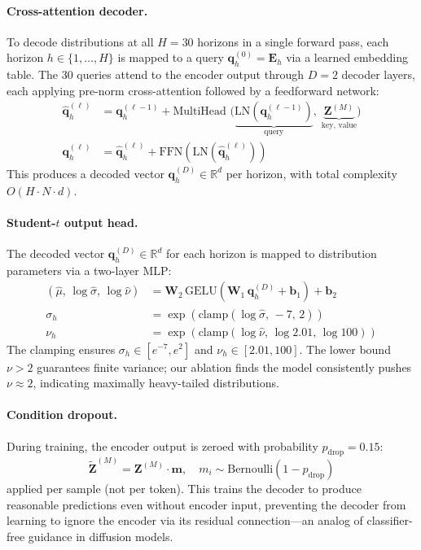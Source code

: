 \documentclass[sigconf]{acmart}
\begin{document}
\paragraph{Cross-attention decoder.}
To decode distributions at all $H = 30$ horizons in a single forward pass, each horizon $h \in \{1, \ldots, H\}$ is mapped to a query $\mathbf{q}_h^{(0)} = \mathbf{E}_h$ via a learned embedding table.
The 30 queries attend to the encoder output through $D = 2$ decoder layers, each applying pre-norm cross-attention followed by a feedforward network:
\begin{align}
\hat{\mathbf{q}}_h^{(\ell)} &= \mathbf{q}_h^{(\ell-1)} + \text{MultiHead }\!\Big(\underbrace{\text{LN}(\mathbf{q}_h^{(\ell-1)})}_{\text{query}},\; \underbrace{\mathbf{Z}^{(M)}}_{\text{key, value}}\Big) \label{eq:cross-attn} \\
\mathbf{q}_h^{(\ell)} &= \hat{\mathbf{q}}_h^{(\ell)} + \text{FFN}\!\left(\text{LN}(\hat{\mathbf{q}}_h^{(\ell)})\right) \nonumber
\end{align}
This produces a decoded vector $\mathbf{q}_h^{(D)} \in \mathbb{R}^d$ per horizon, with total complexity $O(H \cdot N \cdot d)$.

\paragraph{Student-$t$ output head.}
The decoded vector $\mathbf{q}_h^{(D)} \in \mathbb{R}^d$ for each horizon is mapped to distribution parameters via a two-layer MLP:
\begin{align}
(\hat{\mu},\, \log\hat{\sigma},\, \log\hat{\nu}) &= \mathbf{W}_2\,\text{GELU}(\mathbf{W}_1\, \mathbf{q}_h^{(D)} + \mathbf{b}_1) + \mathbf{b}_2 \label{eq:head} \\
\sigma_h &= \exp\!\left(\text{clamp}(\log\hat{\sigma},\, -7,\, 2)\right) \nonumber \\
\nu_h &= \exp\!\left(\text{clamp}(\log\hat{\nu},\, \log 2.01,\, \log 100)\right) \nonumber
\end{align}
The clamping ensures $\sigma_h \in [e^{-7}, e^2]$ and $\nu_h \in [2.01, 100]$.
The lower bound $\nu > 2$ guarantees finite variance; our ablation finds the model consistently pushes $\nu \approx 2$, indicating maximally heavy-tailed distributions.

\paragraph{Condition dropout.}
During training, the encoder output is zeroed with probability $p_{\text{drop}} = 0.15$:
\begin{equation}
\tilde{\mathbf{Z}}^{(M)} = \mathbf{Z}^{(M)} \cdot \mathbf{m}, \quad m_i \sim \text{Bernoulli}(1 - p_{\text{drop}})
\end{equation}
applied per sample (not per token).
This trains the decoder to produce reasonable predictions even without encoder input, preventing the decoder from learning to ignore the encoder via its residual connection---an analog of classifier-free guidance in diffusion models.
\end{document}
